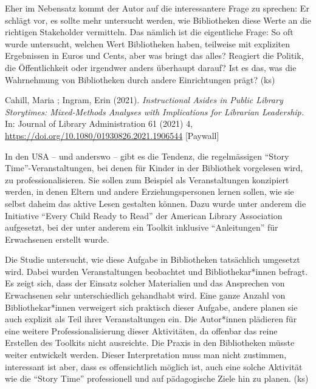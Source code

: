 \documentclass[a4paper,
fontsize=11pt,
oneside,
numbers=noperiodatend,
parskip=half-,
bibliography=totoc,
final
]{scrartcl}
\begin{document}
Eher im Nebensatz kommt der Autor auf die interessantere Frage zu
sprechen: Er schlägt vor, es sollte mehr untersucht werden, wie
Bibliotheken diese Werte an die richtigen Stakeholder vermitteln. Das
nämlich ist die eigentliche Frage: So oft wurde untersucht, welchen Wert
Bibliotheken haben, teilweise mit expliziten Ergebnissen in Euros und
Cents, aber was bringt das alles? Reagiert die Politik, die
Öffentlichkeit oder irgendwer anders überhaupt darauf? Ist es das, was
die Wahrnehmung von Bibliotheken durch andere Einrichtungen prägt? (ks)

\pagebreak

Cahill, Maria ; Ingram, Erin (2021). \emph{Instructional Asides in
Public Library Storytimes: Mixed-Methods Analyses with Implications for
Librarian Leadership.} In: Journal of Library Administration 61 (2021)
4, \url{https://doi.org/10.1080/01930826.2021.1906544} {[}Paywall{]}

In den USA -- und anderswo -- gibt es die Tendenz, die regelmässigen
\enquote{Story Time}-Veranstaltungen, bei denen für Kinder in der
Bibliothek vorgelesen wird, zu professionalisieren. Sie sollen zum
Beispiel als Veranstaltungen konzipiert werden, in denen Eltern und
andere Erziehungspersonen lernen sollen, wie sie selbst daheim das
aktive Lesen gestalten können. Dazu wurde unter anderem die Initiative
\enquote{Every Child Ready to Read} der American Library Association
aufgesetzt, bei der unter anderem ein Toolkit inklusive
\enquote{Anleitungen} für Erwachsenen erstellt wurde.

Die Studie untersucht, wie diese Aufgabe in Bibliotheken tatsächlich
umgesetzt wird. Dabei wurden Veranstaltungen beobachtet und
Bibliothekar*innen befragt. Es zeigt sich, dass der Einsatz solcher
Materialien und das Ansprechen von Erwachsenen sehr unterschiedlich
gehandhabt wird. Eine ganze Anzahl von Bibliothekar*innen verweigert
sich praktisch dieser Aufgabe, andere planen sie auch explizit als Teil
ihrer Veranstaltungen ein. Die Autor*innen plädieren für eine weitere
Professionalisierung dieser Aktivitäten, da offenbar das reine Erstellen
des Toolkits nicht ausreichte. Die Praxis in den Bibliotheken müsste
weiter entwickelt werden. Dieser Interpretation muss man nicht
zustimmen, interessant ist aber, dass es offensichtlich möglich ist,
auch eine solche Aktivität wie die \enquote{Story Time} professionell
und auf pädagogische Ziele hin zu planen. (ks)
\end{document}
